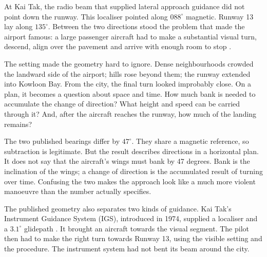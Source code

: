 \label{part:1}
At Kai Tak, the radio beam that supplied lateral approach guidance did not point down the runway. This localiser pointed along $088^\circ$ magnetic. Runway 13 lay along $135^\circ$. Between the two directions stood the problem that made the airport famous: a large passenger aircraft had to make a substantial visual turn, descend, align over the pavement and arrive with enough room to stop \citep[§§1.8.1, 1.10]{cad}.

The setting made the geometry hard to ignore. Dense neighbourhoods crowded the landward side of the airport; hills rose beyond them; the runway extended into Kowloon Bay. From the city, the final turn looked improbably close. On a plan, it becomes a question about space and time. How much bank is needed to accumulate the change of direction? What height and speed can be carried through it? And, after the aircraft reaches the runway, how much of the landing remains?

\FloatBarrier

The two published bearings differ by $47^\circ$. They share a magnetic reference, so subtraction is legitimate. But the result describes directions in a horizontal plan. It does not say that the aircraft's wings must bank by 47 degrees. Bank is the inclination of the wings; a change of direction is the accumulated result of turning over time. Confusing the two makes the approach look like a much more violent manoeuvre than the number actually specifies.

The published geometry also separates two kinds of guidance. Kai Tak's Instrument Guidance System (IGS), introduced in 1974, supplied a localiser and a $3.1^\circ$ glidepath \citep{cadhistory,cad}. It brought an aircraft towards the visual segment. The pilot then had to make the right turn towards Runway 13, using the visible setting and the procedure. The instrument system had not bent its beam around the city.

